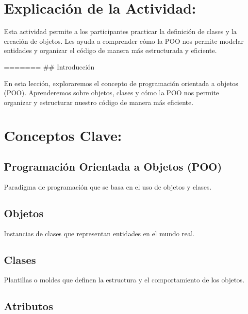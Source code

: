 \documentclass[
  a4paper,
  DIV=11,
  numbers=noendperiod,
  onepage,
  openany]{scrreprt}
\begin{document}
\hypertarget{explicaciuxf3n-de-la-actividad-46}{%
\section{Explicación de la
Actividad:}\label{explicaciuxf3n-de-la-actividad-46}}

Esta actividad permite a los participantes practicar la definición de
clases y la creación de objetos. Les ayuda a comprender cómo la POO nos
permite modelar entidades y organizar el código de manera más
estructurada y eficiente.

======= \#\# Introducción

En esta lección, exploraremos el concepto de programación orientada a
objetos (POO). Aprenderemos sobre objetos, clases y cómo la POO nos
permite organizar y estructurar nuestro código de manera más eficiente.

\hypertarget{conceptos-clave-49}{%
\section{Conceptos Clave:}\label{conceptos-clave-49}}

\hypertarget{programaciuxf3n-orientada-a-objetos-poo-1}{%
\subsection{Programación Orientada a Objetos
(POO)}\label{programaciuxf3n-orientada-a-objetos-poo-1}}

Paradigma de programación que se basa en el uso de objetos y clases.

\hypertarget{objetos-1}{%
\subsection{Objetos}\label{objetos-1}}

Instancias de clases que representan entidades en el mundo real.

\hypertarget{clases-1}{%
\subsection{Clases}\label{clases-1}}

Plantillas o moldes que definen la estructura y el comportamiento de los
objetos.

\hypertarget{atributos-1}{%
\subsection{Atributos}\label{atributos-1}}
\end{document}

